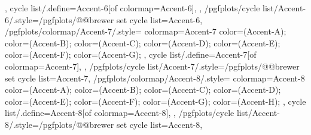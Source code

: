 {{{    },
    cycle list/.define={Accent-6}{[of colormap=Accent-6]},
  },
  /pgfplots/cycle list/Accent-6/.style={/pgfplots/@@brewer set cycle list={Accent-6}},
  /pgfplots/colormap/Accent-7/.style={
    colormap={Accent-7}{
      color=(Accent-A);
      color=(Accent-B);
      color=(Accent-C);
      color=(Accent-D);
      color=(Accent-E);
      color=(Accent-F);
      color=(Accent-G);
    },
    cycle list/.define={Accent-7}{[of colormap=Accent-7]},
  },
  /pgfplots/cycle list/Accent-7/.style={/pgfplots/@@brewer set cycle list={Accent-7}},
  /pgfplots/colormap/Accent-8/.style={
    colormap={Accent-8}{
      color=(Accent-A);
      color=(Accent-B);
      color=(Accent-C);
      color=(Accent-D);
      color=(Accent-E);
      color=(Accent-F);
      color=(Accent-G);
      color=(Accent-H);
    },
    cycle list/.define={Accent-8}{[of colormap=Accent-8]},
  },
  /pgfplots/cycle list/Accent-8/.style={/pgfplots/@@brewer set cycle list={Accent-8}},
}


